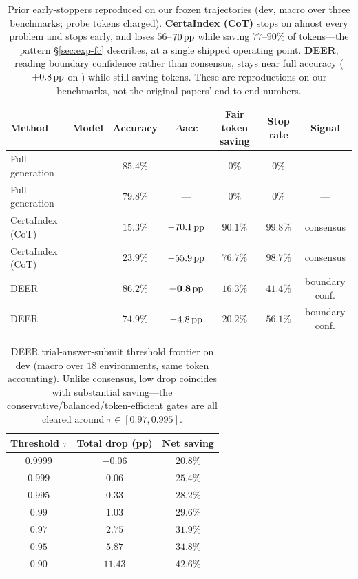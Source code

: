 \begin{table}[t]
  \centering\small
  \begin{tabular}{llccccc}
    \toprule
    Method & Model & Accuracy & $\Delta$acc & Fair token saving & Stop rate & Signal \\
    \midrule
    Full generation & \qweneight{}   & $85.4\%$ & --- & $0\%$ & $0\%$ & --- \\
    Full generation & \dsseven{} & $79.8\%$ & --- & $0\%$ & $0\%$ & --- \\
    \midrule
    CertaIndex (CoT) & \qweneight{}   & $15.3\%$ & $-70.1\,\text{pp}$ & $90.1\%$ & $99.8\%$ & consensus \\
    CertaIndex (CoT) & \dsseven{} & $23.9\%$ & $-55.9\,\text{pp}$ & $76.7\%$ & $98.7\%$ & consensus \\
    \midrule
    DEER       & \qweneight{}   & $86.2\%$ & $\mathbf{+0.8\,\text{pp}}$ & $16.3\%$ & $41.4\%$ & boundary conf. \\
    DEER       & \dsseven{} & $74.9\%$ & $-4.8\,\text{pp}$  & $20.2\%$ & $56.1\%$ & boundary conf. \\
    \bottomrule
  \end{tabular}
  \caption{Prior early-stoppers reproduced on our frozen trajectories (dev, macro
  over three benchmarks; probe tokens charged). \textbf{CertaIndex (CoT)} stops on
  almost every problem and stops early, and loses $56$--$70\,\text{pp}$ while saving
  $77$--$90\%$ of tokens---the pattern \S\ref{sec:exp-fc} describes, at a single
  shipped operating point. \textbf{DEER}, reading boundary confidence rather than
  consensus, stays near full accuracy ($+0.8\,\text{pp}$ on \qweneight{}) while
  still saving tokens. These are reproductions on our benchmarks, not the original
  papers' end-to-end numbers.}
  \label{tab:baselines}
\end{table}

\begin{table}[t]
  \centering\small
  \begin{tabular}{ccc}
    \toprule
    Threshold $\tau$ & Total drop (pp) & Net saving \\
    \midrule
    $0.9999$  & $-0.06$ & $20.8\%$ \\
    $0.999$   & $0.06$  & $25.4\%$ \\
    $0.995$   & $0.33$  & $28.2\%$ \\
    $0.99$    & $1.03$  & $29.6\%$ \\
    $0.97$    & $2.75$  & $31.9\%$ \\
    $0.95$    & $5.87$  & $34.8\%$ \\
    $0.90$    & $11.43$ & $42.6\%$ \\
    \bottomrule
  \end{tabular}
  \caption{DEER trial-answer-submit threshold frontier on dev (macro over $18$
  environments, same token accounting). Unlike consensus, low drop coincides with
  substantial saving---the conservative/balanced/token-efficient gates are all
  cleared around $\tau\in[0.97,0.995]$.}
  \label{tab:deer}
\end{table}



